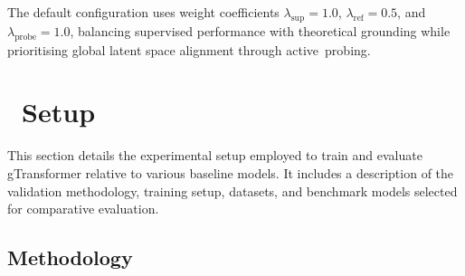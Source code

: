 \documentclass[applsci,article,accept,moreauthors,pdftex]{Definitions/mdpi}
\begin{document}
The default configuration uses weight coefficients $\lambda_{\text{sup}} = 1.0$, $\lambda_{\text{ref}} = 0.5$, and \mbox{$\lambda_{\text{probe}} = 1.0$}, balancing supervised performance with theoretical grounding while {prioritising} global latent space alignment through active~probing.

\section{\protect{}%
~Setup} \label{sec_experiment}

This section details the experimental setup employed to train and evaluate gTransformer relative to various baseline models. It includes a description of the validation methodology, training setup, datasets, and benchmark models selected for comparative evaluation. 

\subsection{Methodology} \label{sec_methodology}
\unskip


\subsubsection{{\protect{}}}%
 \label{sec:rq1_method}
\end{document}
